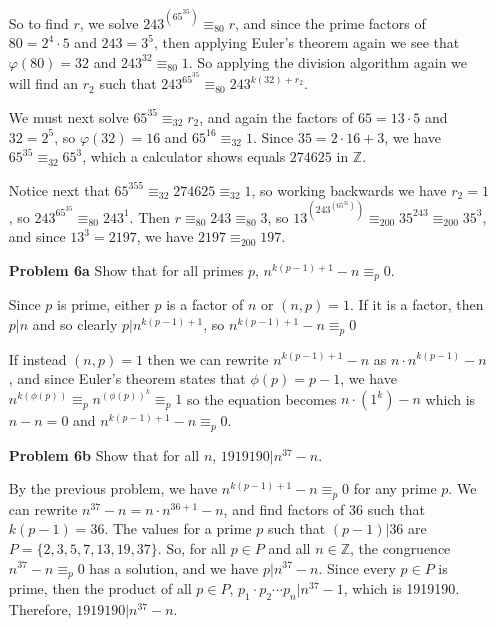 \documentclass[letterpaper]{article}
\newcommand{\Integers}{\mathbb{Z}}
\begin{document}
\begin{itemize}
          So to find \(r\), we solve \(243^{(65^{35})} \equiv_{80} r\), and since the prime factors of \(80 = 2^4 \cdot 5\) and \(243 = 3^5\), then applying Euler's theorem again we see that \(\varphi(80)= 32\) and  \(243^{32}\equiv_{80} 1\). So applying the division algorithm again we will find an \(r_2\) such that \(243^{65^{35}} \equiv_{80} 243^{k(32) + r_2}\).

          We must next solve \(65^{35} \equiv_{32} r_2\), and again the factors of \(65 = 13 \cdot 5\) and \(32 = 2^5\), so \(\varphi (32) = 16\) and \(65^{16} \equiv_{32} 1\). Since \(35 = 2\cdot16 + 3\), we have \(65^{35} \equiv_{32} 65^3\), which a calculator shows equals \(274625\) in \(\Integers\).

          Notice next that \(65^{355} \equiv_{32} 274625 \equiv_{32} 1\), so working backwards we have \(r_2 = 1\), so \(243^{65^{35}} \equiv_{80} 243^1\). Then \(r \equiv_{80} 243 \equiv_{80} 3\), so \(13^{(243^{(65^{35})})} \equiv_{200} 35^{243} \equiv_{200} 35^3\), and since \(13^3  = 2197\), we have \(2197 \equiv_{200} 197\).

    \item[\textbf{Problem 6a}] Show that for all primes \(p\), \(n^{k(p-1) + 1} - n \equiv_p 0\).

          Since \(p\) is prime, either \(p\) is a factor of \(n\) or \((n,p) = 1\). If it is a factor, then \(p|n\) and so clearly \(p|n^{k(p-1) + 1}\), so \(n^{k(p-1) + 1} - n \equiv_p 0\)

          If instead \((n,p) = 1\) then we can rewrite \(n^{k(p-1) + 1} - n\) as \(n\cdot n^{k(p-1)} - n\), and since Euler's theorem states that  \(\phi(p) = p-1 \), we have \(n^{k(\phi(p))} \equiv_p n^{(\phi(p))^k} \equiv_p 1\) so the equation becomes \(n\cdot(1^k) - n\) which is \(n-n = 0\) and \(n^{k(p-1) + 1} - n \equiv_p 0\).

    \item[\textbf{Problem 6b}] Show that for all \(n\), \(1919190 | n^{37} - n\).

          By the previous problem, we have \(n^{k(p-1) + 1} - n \equiv_p 0\) for any prime \(p\). We can rewrite \(n^{37} - n = n\cdot n^{36 + 1} - n\), and find factors of \(36\) such that \(k(p-1) = 36\). The values for a prime \(p\) such that \((p-1)|36\) are \(P = \{2, 3, 5, 7, 13, 19, 37\}\). So, for all \(p \in P\) and all \(n \in \Integers\), the congruence \(n^{37} - n \equiv_p 0\) has a solution, and we have \(p | n^{37} - n\). Since every \(p \in P\) is prime, then the product of all \(p \in P\), \(p_1\cdot p_2\cdots p_n | n^{37} - 1\), which is 1919190. Therefore, \(1919190 | n^{37} - n\).


\end{itemize}
\end{document}
